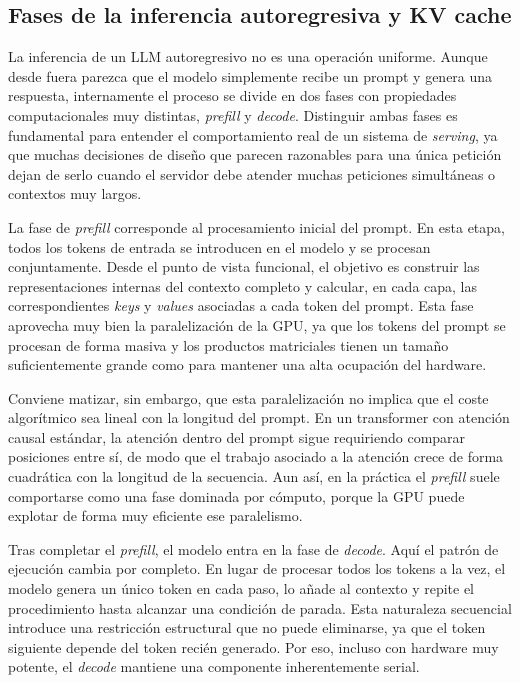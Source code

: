 \subsection{Fases de la inferencia autoregresiva y KV cache}

La inferencia de un LLM autoregresivo no es una operación uniforme. Aunque desde fuera parezca que el modelo simplemente recibe un prompt y genera una respuesta, internamente el proceso se divide en dos fases con propiedades computacionales muy distintas, \textit{prefill} y \textit{decode}. Distinguir ambas fases es fundamental para entender el comportamiento real de un sistema de \textit{serving}, ya que muchas decisiones de diseño que parecen razonables para una única petición dejan de serlo cuando el servidor debe atender muchas peticiones simultáneas o contextos muy largos.

La fase de \textit{prefill} corresponde al procesamiento inicial del prompt. En esta etapa, todos los tokens de entrada se introducen en el modelo y se procesan conjuntamente. Desde el punto de vista funcional, el objetivo es construir las representaciones internas del contexto completo y calcular, en cada capa, las correspondientes \textit{keys} y \textit{values} asociadas a cada token del prompt. Esta fase aprovecha muy bien la paralelización de la GPU, ya que los tokens del prompt se procesan de forma masiva y los productos matriciales tienen un tamaño suficientemente grande como para mantener una alta ocupación del hardware.

Conviene matizar, sin embargo, que esta paralelización no implica que el coste algorítmico sea lineal con la longitud del prompt. En un transformer con atención causal estándar, la atención dentro del prompt sigue requiriendo comparar posiciones entre sí, de modo que el trabajo asociado a la atención crece de forma cuadrática con la longitud de la secuencia. Aun así, en la práctica el \textit{prefill} suele comportarse como una fase dominada por cómputo, porque la GPU puede explotar de forma muy eficiente ese paralelismo.

Tras completar el \textit{prefill}, el modelo entra en la fase de \textit{decode}. Aquí el patrón de ejecución cambia por completo. En lugar de procesar todos los tokens a la vez, el modelo genera un único token en cada paso, lo añade al contexto y repite el procedimiento hasta alcanzar una condición de parada. Esta naturaleza secuencial introduce una restricción estructural que no puede eliminarse, ya que el token siguiente depende del token recién generado. Por eso, incluso con hardware muy potente, el \textit{decode} mantiene una componente inherentemente serial.

